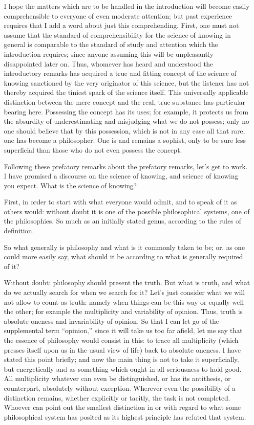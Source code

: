 I hope the matters which are to be handled in the introduction will
become easily comprehensible to everyone of even moderate attention;
but past experience requires that I add a word about just this comprehending.
First, one must not assume that the standard of comprehensibility for
the science of knowing in general is comparable to the standard of
study and attention which the introduction requires;
since anyone assuming this will be unpleasantly disappointed later on.
Thus, whomever has heard and understood the introductory remarks
has acquired a true and fitting concept of the science of knowing
sanctioned by the very originator of this science,
but the listener has not thereby acquired
the tiniest spark of the science itself.
This universally applicable distinction between
the mere concept and the real, true substance has
particular bearing here.
Possessing the concept has its uses;
for example, it protects us from the absurdity of
underestimating and misjudging what we do not possess;
only no one should believe that by this possession,
which is not in any case all that rare,
one has become a philosopher.
One is and remains a sophist,
only to be sure less superficial than
those who do not even possess the concept.

Following these prefatory remarks about the prefatory remarks,
let's get to work.
I have promised a discourse on the science of knowing,
and science of knowing you expect.
What is the science of knowing?

First, in order to start with what everyone would admit,
and to speak of it as others would:
without doubt it is one of
the possible philosophical systems,
one of the philosophies.
So much as an initially stated genus,
according to the rules of definition.

So what generally is philosophy and what is it commonly taken to be;
or, as one could more easily say, what should it be
according to what is generally required of it?

Without doubt: philosophy should present the truth.
But what is truth, and what do we actually search for when we search for it?
Let's just consider what we will not allow to count as truth:
namely when things can be this way or equally well the other;
for example the multiplicity and variability of opinion.
Thus, truth is absolute oneness and invariability of opinion.
So that I can let go of the supplemental term “opinion,”
since it will take us too far afield, let me say that
the essence of philosophy would consist in this:
to trace all multiplicity
(which presses itself upon us in the usual view of life)
back to absolute oneness.
I have stated this point briefly;
and now the main thing is not to take it superficially,
but energetically and as something which ought
in all seriousness to hold good.
All multiplicity whatever can even be distinguished, or
has its antithesis, or counterpart, absolutely without exception.
Wherever even the possibility of a distinction remains,
whether explicitly or tacitly, the task is not completed.
Whoever can point out the smallest distinction in or
with regard to what some philosophical system has posited
as its highest principle has refuted that system.

